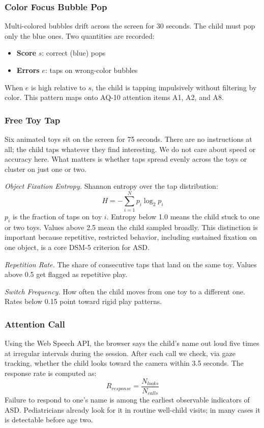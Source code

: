 \documentclass[conference]{IEEEtran}
\begin{document}
\subsubsection{Color Focus Bubble Pop}
Multi-colored bubbles drift across the screen for 30 seconds. The child must pop only the blue ones. Two quantities are recorded:
\begin{itemize}
    \item \textbf{Score} $s$: correct (blue) pops
    \item \textbf{Errors} $e$: taps on wrong-color bubbles
\end{itemize}
When $e$ is high relative to $s$, the child is tapping impulsively without filtering by color. This pattern maps onto AQ-10 attention items A1, A2, and A8.

\subsubsection{Free Toy Tap}
Six animated toys sit on the screen for 75 seconds. There are no instructions at all; the child taps whatever they find interesting. We do not care about speed or accuracy here. What matters is whether taps spread evenly across the toys or cluster on just one or two.

\textit{Object Fixation Entropy.} Shannon entropy over the tap distribution:
\begin{equation}
H = -\sum_{i=1}^{N} p_i \log_2 p_i
\label{eq:entropy}
\end{equation}
$p_i$ is the fraction of taps on toy $i$. Entropy below 1.0 means the child stuck to one or two toys. Values above 2.5 mean the child sampled broadly. This distinction is important because repetitive, restricted behavior, including sustained fixation on one object, is a core DSM-5 criterion for ASD.

\textit{Repetition Rate.} The share of consecutive taps that land on the same toy. Values above 0.5 get flagged as repetitive play.

\textit{Switch Frequency.} How often the child moves from one toy to a different one. Rates below 0.15 point toward rigid play patterns.

\subsubsection{Attention Call}
Using the Web Speech API, the browser says the child's name out loud five times at irregular intervals during the session. After each call we check, via gaze tracking, whether the child looks toward the camera within 3.5 seconds. The response rate is computed as:
\begin{equation}
R_{response} = \frac{N_{looks}}{N_{calls}}
\label{eq:response_rate}
\end{equation}
Failure to respond to one's name is among the earliest observable indicators of ASD. Pediatricians already look for it in routine well-child visits; in many cases it is detectable before age two.
\end{document}
